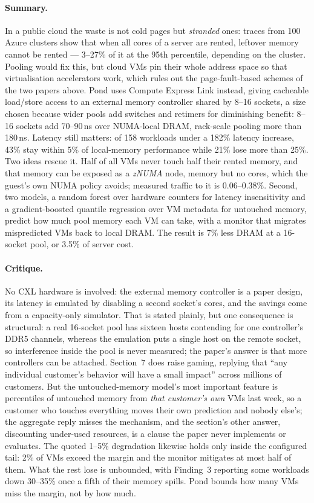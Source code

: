 \paragraph{Summary.}
In a public cloud the waste is not cold pages but \emph{stranded} ones: traces from 100
Azure clusters show that when all cores of a server are rented, leftover memory cannot
be rented --- 3--27\% of it at the 95th percentile, depending on the cluster. Pooling would fix this, but
cloud VMs pin their whole address space so that virtualisation accelerators work, which
rules out the page-fault-based schemes of the two papers above. Pond uses Compute
Express Link instead, giving cacheable load/store access to an external memory
controller shared by 8--16 sockets, a size chosen because wider pools add switches
and retimers for diminishing benefit: 8--16 sockets add 70--90\,ns over
NUMA-local DRAM, rack-scale pooling more than 180\,ns. Latency still matters: of 158
workloads under a 182\% latency increase, 43\% stay within 5\% of local-memory
performance while 21\% lose more than 25\%. Two ideas rescue it.
Half of all VMs never touch half their rented memory, and that memory can be exposed as
a \emph{zNUMA} node, memory but no cores, which the guest's own NUMA policy
avoids; measured traffic to it is 0.06--0.38\%. Second, two models, a random forest over
hardware counters for latency insensitivity and a gradient-boosted quantile regression
over VM metadata for untouched memory, predict how much pool memory each VM can take,
with a monitor that migrates mispredicted VMs back to local DRAM. The result is 7\%
less DRAM at a 16-socket pool, or 3.5\% of server cost.

\paragraph{Critique.}
No CXL hardware is involved: the external memory controller is a paper design, its
latency is emulated by disabling a second socket's cores, and the savings come from a
capacity-only simulator. That is stated plainly, but one consequence is structural: a
real 16-socket pool has sixteen hosts contending for one controller's DDR5 channels,
whereas the emulation puts a single host on the remote socket, so interference inside the
pool is never measured; the paper's answer is that more controllers can be attached.
Section~7 does raise gaming, replying that ``any individual customer's behavior will have
a small impact'' across millions of customers. But the untouched-memory model's most
important feature is percentiles of untouched memory from \emph{that customer's own} VMs
last week, so a customer who touches everything moves their own prediction and nobody
else's; the aggregate reply misses the mechanism, and the section's other answer,
discounting under-used resources, is a clause the paper never implements or evaluates.
The quoted 1--5\% degradation likewise holds only inside the configured tail: 2\% of VMs
exceed the margin and the monitor mitigates at most half of them. What the rest lose is
unbounded, with Finding~3 reporting some workloads down 30--35\% once a fifth of their
memory spills. Pond bounds how many VMs miss the margin, not by how much.
